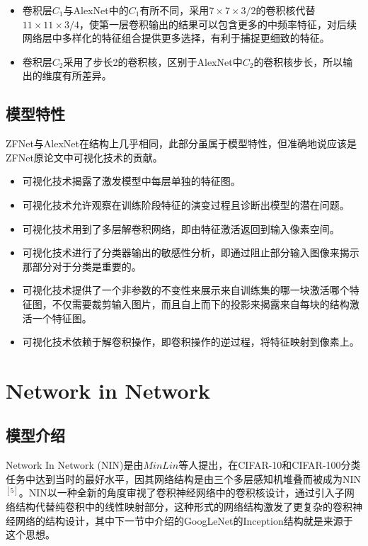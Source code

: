 \documentclass[12pt,a4paper,UTF8,twoside]{book}
\providecommand{\tightlist}{%
  \setlength{\itemsep}{0pt}\setlength{\parskip}{0pt}}
\begin{document}
\begin{itemize}
\item
  卷积层\(C_1\)与AlexNet中的\(C_1\)有所不同，采用\(7\times7\times3/2\)的卷积核代替\(11\times11\times3/4​\)，使第一层卷积输出的结果可以包含更多的中频率特征，对后续网络层中多样化的特征组合提供更多选择，有利于捕捉更细致的特征。
\item
  卷积层\(C_2\)采用了步长2的卷积核，区别于AlexNet中\(C_2\)的卷积核步长，所以输出的维度有所差异。
\end{itemize}

\hypertarget{ux6a21ux578bux7279ux6027-2}{%
\subsection{模型特性}\label{ux6a21ux578bux7279ux6027-2}}

\hspace{0pt}ZFNet与AlexNet在结构上几乎相同，此部分虽属于模型特性，但准确地说应该是ZFNet原论文中可视化技术的贡献。

\begin{itemize}
\tightlist
\item
  可视化技术揭露了激发模型中每层单独的特征图。
\item
  可视化技术允许观察在训练阶段特征的演变过程且诊断出模型的潜在问题。
\item
  可视化技术用到了多层解卷积网络，即由特征激活返回到输入像素空间。
\item
  可视化技术进行了分类器输出的敏感性分析，即通过阻止部分输入图像来揭示那部分对于分类是重要的。
\item
  可视化技术提供了一个非参数的不变性来展示来自训练集的哪一块激活哪个特征图，不仅需要裁剪输入图片，而且自上而下的投影来揭露来自每块的结构激活一个特征图。
\item
  可视化技术依赖于解卷积操作，即卷积操作的逆过程，将特征映射到像素上。
\end{itemize}

\hypertarget{network-in-network}{%
\section{Network in Network}\label{network-in-network}}

\hypertarget{ux6a21ux578bux4ecbux7ecd-3}{%
\subsection{模型介绍}\label{ux6a21ux578bux4ecbux7ecd-3}}

Network In Network (NIN)是由\(Min Lin\)等人提出，在CIFAR-10和CIFAR-100分类任务中达到当时的最好水平，因其网络结构是由三个多层感知机堆叠而被成为NIN\(^{[5]}\)。NIN以一种全新的角度审视了卷积神经网络中的卷积核设计，通过引入子网络结构代替纯卷积中的线性映射部分，这种形式的网络结构激发了更复杂的卷积神经网络的结构设计，其中下一节中介绍的GoogLeNet的Inception结构就是来源于这个思想。
\end{document}
